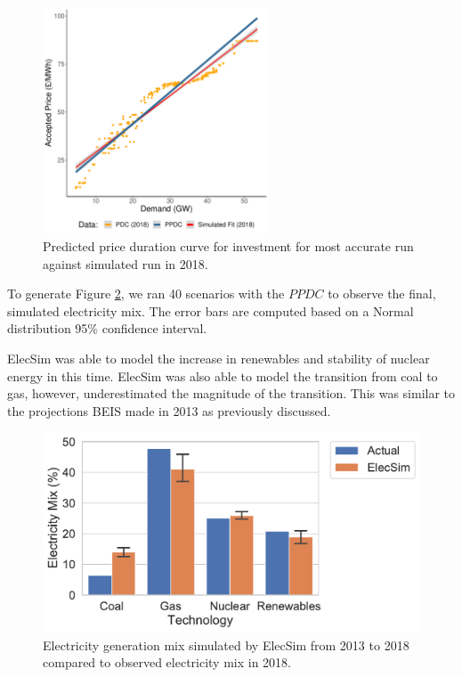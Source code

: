 \begin{figure}
	\centering
	\includegraphics[width=0.6\textwidth]{Chapter4/figures/e-Energy-2020/results/best_run_price_dur_curve.pdf}
	\caption{Predicted price duration curve for investment for most accurate run against simulated run in 2018.}
	\label{fig:best_price_curve}
\end{figure}



To generate Figure \ref{fig:uk_validated_results_2018}, we ran 40 scenarios with the $PPDC$ to observe the final, simulated electricity mix. The error bars are computed based on a Normal distribution 95\% confidence interval.

ElecSim was able to model the increase in renewables and stability of nuclear energy in this time. ElecSim was also able to model the transition from coal to gas, however, underestimated the magnitude of the transition. This was similar to the projections BEIS made in 2013 as previously discussed.

\begin{figure}
	\centering
	\includegraphics[width=\textwidth]{Chapter4/figures/e-Energy-2020/results/best_run_coal_dropout_95_ci.pdf}
	\caption{Electricity generation mix simulated by ElecSim from 2013 to 2018 compared to observed electricity mix in 2018.}
	\label{fig:uk_validated_results_2018}
\end{figure}


